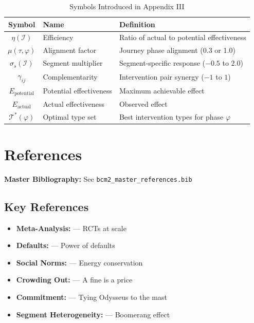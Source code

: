 \begin{table}[htbp]
\centering
\caption{Symbols Introduced in Appendix III}
\label{tab:eih-symbols}
\renewcommand{\arraystretch}{1.3}
\begin{tabular}{@{}clp{6cm}@{}}
\toprule
\textbf{Symbol} & \textbf{Name} & \textbf{Definition} \\
\midrule
$\eta(\mathcal{I})$ & Efficiency & Ratio of actual to potential effectiveness \\
$\mu(\tau, \varphi)$ & Alignment factor & Journey phase alignment (0.3 or 1.0) \\
$\sigma_s(\mathcal{I})$ & Segment multiplier & Segment-specific response ($-0.5$ to $2.0$) \\
$\gamma_{ij}$ & Complementarity & Intervention pair synergy ($-1$ to $1$) \\
$E_{\text{potential}}$ & Potential effectiveness & Maximum achievable effect \\
$E_{\text{actual}}$ & Actual effectiveness & Observed effect \\
$\mathcal{T}^*(\varphi)$ & Optimal type set & Best intervention types for phase $\varphi$ \\
\bottomrule
\end{tabular}
\end{table}


\section{References}
\label{sec:eih-references}

\begin{tcolorbox}[colback=blue!5!white, colframe=blue!75!black]
\textbf{Master Bibliography:} See \texttt{bcm2\_master\_references.bib}
\end{tcolorbox}

\subsection{Key References}

\begin{itemize}[nosep]
\item \textbf{Meta-Analysis:} \citet{dellavigna2022} --- RCTs at scale
\item \textbf{Defaults:} \citet{madrian2001} --- Power of defaults
\item \textbf{Social Norms:} \citet{allcott2011} --- Energy conservation
\item \textbf{Crowding Out:} \citet{gneezy2000} --- A fine is a price
\item \textbf{Commitment:} \citet{ashraf2006} --- Tying Odysseus to the mast
\item \textbf{Segment Heterogeneity:} \citet{schultz2007} --- Boomerang effect
\end{itemize}

